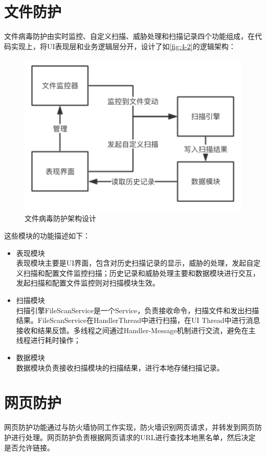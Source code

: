 \documentclass[format=final, language=chinese, degree=fyp]{hustthesis}
\begin{document}
\section{文件防护}

文件病毒防护由实时监控、自定义扫描、威胁处理和扫描记录四个功能组成，在代码实现上，将UI表现层和业务逻辑层分开，设计了如\autoref{fig:4-2}的逻辑架构：


\begin{figure}[!h]
\centering
\includegraphics[width=.6\textwidth]{function_2_ori.png}
\caption{文件病毒防护架构设计}\label{fig:4-2}
\end{figure}

这些模块的功能描述如下：

\begin{itemize}
    \item 表现模块\\ 表现模块主要是UI界面，包含对历史扫描记录的显示，威胁的处理，发起自定义扫描和配置文件监控扫描；历史记录和威胁处理主要和数据模块进行交互，发起扫描和配置文件监控则对扫描模块生效。
    \item 扫描模块\\ 扫描引擎FileScanService是一个Service，负责接收命令，扫描文件和发出扫描结果。FileScanService在HandlerThread中进行扫描，在UI Thread中进行消息接收和结果反馈。多线程之间通过Handler-Message机制进行交流，避免在主线程进行耗时操作；
    \item 数据模块\\ 数据模块负责接收扫描模块的扫描结果，进行本地存储扫描记录。
\end{itemize}

\section{网页防护}


网页防护功能通过与防火墙协同工作实现，防火墙识别网页请求，并转发到网页防护进行处理。网页防护负责根据网页请求的URL进行查找本地黑名单，然后决定是否允许链接。
\end{document}
